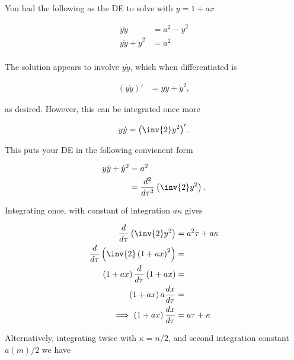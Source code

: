 \documentclass{article}      %
\begin{document}

%
%

You had the following as the DE to solve with $y = 1 + ax$

\begin{align*}
y\ddot{y} &= a^2 - \dot{y}^2 \\
y\ddot{y} + \dot{y}^2 &= a^2 \\
\end{align*}

The solution appears to involve $y\dot{y}$, which when differentiated
is

\begin{align*}
(y\dot{y})' &= y \ddot{y} + \dot{y}^2,
\end{align*}

as desired.  However, this can be integrated once more

\begin{align*}
y\dot{y} = \left(\inv{2} y^2\right)'.
\end{align*}

This puts your DE in the following convienent form

\begin{align*}
y\ddot{y} + \dot{y}^2 &= a^2 \\
&= \frac{d^2}{d\tau^2}\left(\inv{2} y^2\right).
\end{align*}

Integrating once, with constant of integration $a \kappa$ gives

\begin{align*}
\frac{d}{d\tau}\left(\inv{2} y^2\right) &= a^2 \tau + a \kappa \\
\frac{d}{d\tau}\left(\inv{2} \left(1+ax\right)^2\right) &=  \\
\left(1+ax\right)\frac{d}{d\tau}\left(1+ax\right) &=  \\
\left(1+ax\right)a\frac{dx}{d\tau} &=  \\
\implies
\left(1+ax\right)\frac{dx}{d\tau} &= a\tau + \kappa \\
\end{align*}

Alternatively, integrating twice with $\kappa = n/2$, and second integration constant $a (m)/2$ we have
\end{document}
